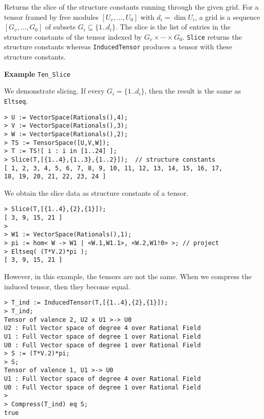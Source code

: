 Returns the slice of the structure constants running through the given grid. 
For a tensor framed by free modules $[U_v,\dots,U_0]$ with $d_i=\dim U_i$, 
a grid is a sequence $[G_v,\dots,G_0]$ of subsets $G_i\subseteq \{1..d_i\}$.
The slice is the list of entries in the structure constants of the tensor
indexed by $G_v\times \cdots \times G_0$. {\tt Slice} returns the structure
constants whereas {\tt InducedTensor} produces a tensor with these
structure constants. 

\begin{framed} {\bf Example} {\tt Ten\_Slice}\\
{\small We demonstrate slicing. If every $G_i=\{1..d_i\}$, then the result is the same as {\tt Eltseq}.
\begin{lstlisting}[frame=single,basicstyle=\ttfamily\color{black!30!
teal},backgroundcolor=\color{white!70!gray}]
> U := VectorSpace(Rationals(),4);
> V := VectorSpace(Rationals(),3);
> W := VectorSpace(Rationals(),2);
> TS := TensorSpace([U,V,W]);
> T := TS![ i : i in [1..24] ];
> Slice(T,[{1..4},{1..3},{1..2}]);  // structure constants
[ 1, 2, 3, 4, 5, 6, 7, 8, 9, 10, 11, 12, 13, 14, 15, 16, 17,
18, 19, 20, 21, 22, 23, 24 ]
\end{lstlisting}
We obtain the slice data as structure constants of a tensor.
\begin{lstlisting}[frame=single,basicstyle=\ttfamily\color{black!30!
teal},backgroundcolor=\color{white!70!gray}]
> Slice(T,[{1..4},{2},{1}]); 
[ 3, 9, 15, 21 ]
> 
> W1 := VectorSpace(Rationals(),1);
> pi := hom< W -> W1 | <W.1,W1.1>, <W.2,W1!0> >; // project
> Eltseq( (T*V.2)*pi );
[ 3, 9, 15, 21 ]
\end{lstlisting}
However, in this example, the tensors are not the same. 
When we compress the induced tensor, then they become equal.
\begin{lstlisting}[frame=single,basicstyle=\ttfamily\color{black!30!
teal},backgroundcolor=\color{white!70!gray}]
> T_ind := InducedTensor(T,[{1..4},{2},{1}]);
> T_ind;
Tensor of valence 2, U2 x U1 >-> U0
U2 : Full Vector space of degree 4 over Rational Field
U1 : Full Vector space of degree 1 over Rational Field
U0 : Full Vector space of degree 1 over Rational Field
> S := (T*V.2)*pi;
> S;
Tensor of valence 1, U1 >-> U0
U1 : Full Vector space of degree 4 over Rational Field
U0 : Full Vector space of degree 1 over Rational Field
> 
> Compress(T_ind) eq S;
true
\end{lstlisting} }
\end{framed}

